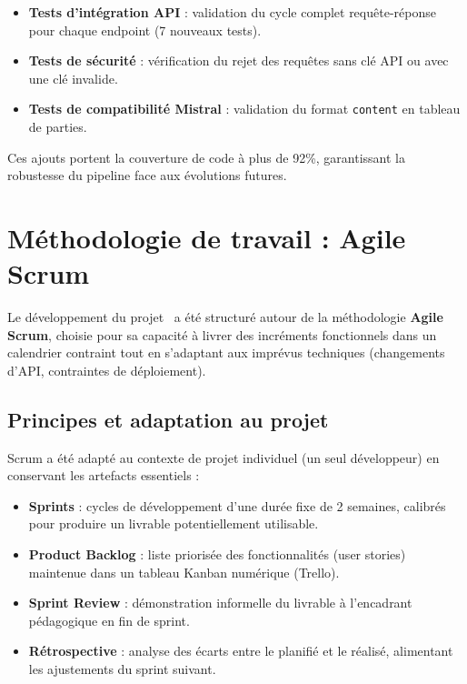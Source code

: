 \begin{itemize}
    \item \textbf{Tests d'intégration API} : validation du cycle complet requête-réponse pour chaque endpoint (7 nouveaux tests).
    \item \textbf{Tests de sécurité} : vérification du rejet des requêtes sans clé API ou avec une clé invalide.
    \item \textbf{Tests de compatibilité Mistral} : validation du format \texttt{content} en tableau de parties.
\end{itemize}

Ces ajouts portent la couverture de code à plus de 92\%, garantissant la robustesse du pipeline face aux évolutions futures.

\section{Méthodologie de travail : Agile Scrum}

Le développement du projet \AZIZA\ a été structuré autour de la méthodologie \textbf{Agile Scrum}, choisie pour sa capacité à livrer des incréments fonctionnels dans un calendrier contraint tout en s'adaptant aux imprévus techniques (changements d'API, contraintes de déploiement).

\subsection{Principes et adaptation au projet}

Scrum a été adapté au contexte de projet individuel (un seul développeur) en conservant les artefacts essentiels :

\begin{itemize}
    \item \textbf{Sprints} : cycles de développement d'une durée fixe de 2 semaines, calibrés pour produire un livrable potentiellement utilisable.
    \item \textbf{Product Backlog} : liste priorisée des fonctionnalités (user stories) maintenue dans un tableau Kanban numérique (Trello).
    \item \textbf{Sprint Review} : démonstration informelle du livrable à l'encadrant pédagogique en fin de sprint.
    \item \textbf{Rétrospective} : analyse des écarts entre le planifié et le réalisé, alimentant les ajustements du sprint suivant.
\end{itemize}

